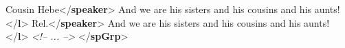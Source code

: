 \begin{shaded}
\mbox{}\newline 
\hspace*{1em}Cousin Hebe{</\textbf{speaker}>}\mbox{}\newline 
\hspace*{1em}\mbox{}\newline 
\hspace*{1em}\hspace*{1em}And we are his sisters and his cousins and his aunts!{</\textbf{l}>}\mbox{}\newline 
\hspace*{1em}\mbox{}\newline 
{}\mbox{}\newline 
{}\mbox{}\newline 
\hspace*{1em}Rel.{</\textbf{speaker}>}\mbox{}\newline 
\hspace*{1em}\mbox{}\newline 
\hspace*{1em}\hspace*{1em}And we are his sisters and his cousins and his aunts!{</\textbf{l}>}\mbox{}\newline 
\hspace*{1em}\mbox{}\newline 
{}\mbox{}\newline 
\textit{<!-- ... -->}\mbox{}\newline 
{</\textbf{spGrp}>}\end{shaded}\egroup\par 
